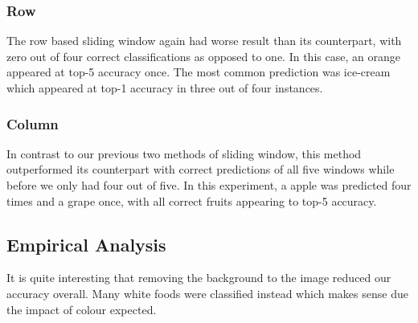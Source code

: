 \subsubsection*{Row}
The row based sliding window again had worse result than its counterpart, with
zero out of four correct classifications as opposed to one. In this case, an
orange appeared at top-5 accuracy once. The most common prediction was ice-cream
which appeared at top-1 accuracy in three out of four instances.

\subsubsection*{Column}
In contrast to our previous two methods of sliding window, this method
outperformed its counterpart with correct predictions of all five windows while
before we only had four out of five. In this experiment, a apple was predicted
four times and a grape once, with all correct fruits appearing to top-5
accuracy.

\subsection*{Empirical Analysis}
It is quite interesting that removing the background to the image reduced our
accuracy overall. Many white foods were classified instead which makes sense due
the impact of colour expected.
